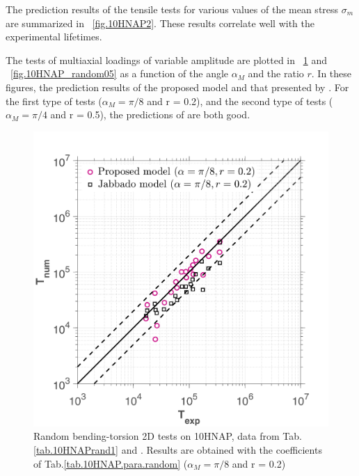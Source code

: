 \documentclass[3p,times,procedia,number]{elsarticle}
\newcommand{\figref}[1]{\figurename~\ref{#1}}
\begin{document}
The prediction results of the tensile tests for various values of the mean stress $\sigma_m$ are summarized in \figref{fig.10HNAP2}. These results correlate well with the experimental lifetimes. 


The tests of multiaxial loadings of variable amplitude are plotted in \figref{fig.10HNAP_random02} and \figref{fig.10HNAP_random05} as a function of the angle $\alpha_{M}$ and the ratio $r$. In these figures, the prediction results of the proposed model and that presented by \cite{carpinteri2003multiaxial}. For the first type of tests ($\alpha_{M} = \pi/8$ and r = 0.2), and the second type of tests ($\alpha_{M} = \pi/4$ and r = 0.5), the predictions of \cite{carpinteri2003multiaxial} are both good. 
\begin{figure}[!h]
	\centering
	\includegraphics[width=\textwidth]{figures//HNAP_random_r02_error.png} 
	\caption{Random bending-torsion 2D tests on 10HNAP, data from Tab.\ref{tab.10HNAPrand1} and \cite{jabbado:pastel-00002116}. Results are obtained with the coefficients of Tab.\ref{tab.10HNAP.para.random} ($\alpha_{M} = \pi/8$ and r = 0.2)}
	\label{fig.10HNAP_random02}
\end{figure}
\end{document}
